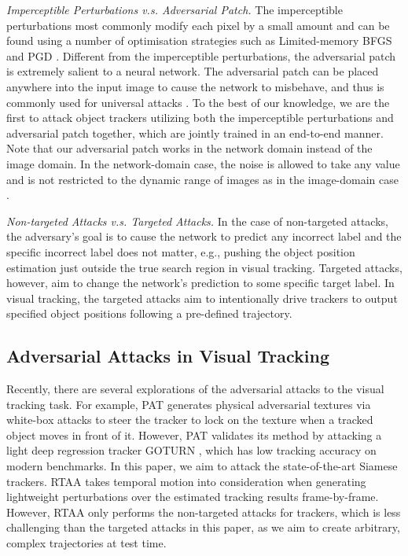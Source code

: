 \documentclass{article}
\newcommand{\eg}{e.g.}
\begin{document}
\textit{Imperceptible Perturbations v.s. Adversarial Patch.} The imperceptible perturbations most commonly modify each pixel by a small amount and can be found using a number of optimisation strategies such as Limited-memory BFGS \cite{intriguing} and PGD \cite{PGD}.
Different from the imperceptible perturbations, the adversarial patch is extremely salient to a neural network. The adversarial patch can be placed anywhere into the input image to cause the network to misbehave, and thus is commonly used for universal attacks \cite{patch}.
To the best of our knowledge, we are the first to attack object trackers utilizing both the imperceptible perturbations and adversarial patch together, which are jointly trained in an end-to-end manner.
Note that our adversarial patch works in the network domain instead of the image domain. In the network-domain case, the noise is allowed to take any value and is not restricted to the dynamic range of images as in the image-domain case \cite{karmon2018lavan}.

\textit{Non-targeted Attacks v.s. Targeted Attacks.} In the case of non-targeted attacks, the adversary's goal is to cause the network to predict any incorrect label and the specific incorrect label does not matter, \eg, pushing the object position estimation just outside the true search region in visual tracking.
Targeted attacks, however, aim to change the network's prediction to some specific target label. In visual tracking, the targeted attacks aim to intentionally drive trackers to output specified object positions following a pre-defined trajectory.

\subsection{Adversarial Attacks in Visual Tracking}

Recently, there are several explorations of the adversarial attacks to the visual tracking task. For example, PAT \cite{PAT} generates physical adversarial textures via white-box attacks to steer the tracker to lock on the texture when a tracked object moves in front of it. However, PAT validates its method by attacking a light deep regression tracker GOTURN \cite{GOTURN}, which has low tracking accuracy on modern benchmarks. In this paper, we aim to attack the state-of-the-art Siamese trackers.
RTAA \cite{RTAA} takes temporal motion into consideration when generating lightweight perturbations over the estimated tracking results frame-by-frame. However, RTAA only performs the non-targeted attacks for trackers, which is less challenging than the targeted attacks in this paper, as we aim to create arbitrary, complex trajectories at test time. 
\end{document}
